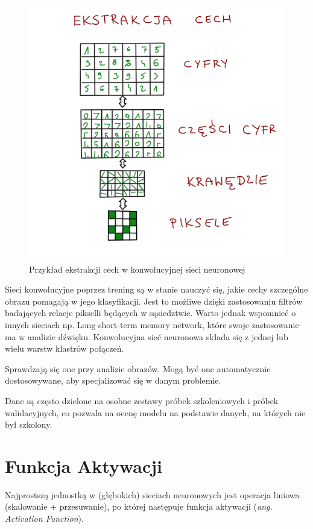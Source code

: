 \documentclass[brudnopis]{xmgr}
\begin{document}
\begin{figure}[!tbh]
\centering
\includegraphics[width=.8\hsize]{fig/10}
\caption{Przykład ekstrakcji cech w konwolucyjnej sieci neuronowej\label{RYS.2}}
\end{figure}

Sieci konwolucyjne poprzez trening są w stanie nauczyć się, jakie cechy szczególne obrazu pomagają w jego klasyfikacji. Jest to możliwe dzięki zastosowaniu filtrów badających relacje pikselli będących w sąsiedztwie. Warto jednak wspomnieć o innych sieciach np. Long short-term memory network, które swoje zastosowanie ma w analizie dźwięku. Konwolucyjna sieć neuronowa składa się z jednej lub wielu warstw klastrów połączeń.

 Sprawdzają się one przy analizie obrazów.  Mogą być one automatycznie dostosowywane, aby specjalizować się w danym problemie.

Dane są często dzielone na osobne zestawy próbek szkoleniowych i próbek walidacyjnych, co pozwala na ocenę modelu na podstawie danych, na których nie był szkolony.





\section{Funkcja Aktywacji  \label{s:dsssl}}

Najprostszą jednostką w (głębokich) sieciach neuronowych jest operacja liniowa (skalowanie + przesuwanie), po której następuje funkcja aktywacji (\textit{ang. Activation Function}).
\end{document}
